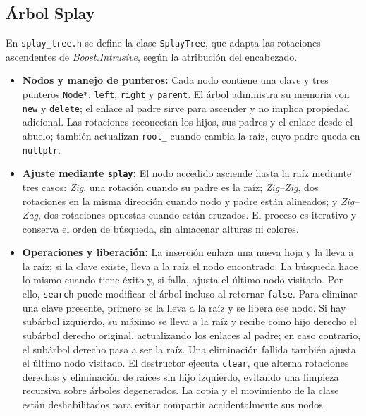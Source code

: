 \documentclass[11pt,letterpaper]{article}
\begin{document}
\subsection{Árbol Splay}

En \texttt{splay\_tree.h} se define la clase \texttt{SplayTree}, que
adapta las rotaciones ascendentes de \textit{Boost.Intrusive}, según
la atribución del encabezado.

\begin{itemize}
    \item \textbf{Nodos y manejo de punteros:}
    Cada nodo contiene una clave y tres punteros \texttt{Node*}:
    \texttt{left}, \texttt{right} y \texttt{parent}. El árbol administra
    su memoria con \texttt{new} y \texttt{delete}; el enlace al padre
    sirve para ascender y no implica propiedad adicional. Las rotaciones
    reconectan los hijos, sus padres y el enlace desde el abuelo; también
    actualizan \texttt{root\_} cuando cambia la raíz, cuyo padre queda
    en \texttt{nullptr}.

    \item \textbf{Ajuste mediante \texttt{splay}:}
    El nodo accedido asciende hasta la raíz mediante tres casos:
    \textit{Zig}, una rotación cuando su padre es la raíz;
    \textit{Zig--Zig}, dos rotaciones en la misma dirección cuando
    nodo y padre están alineados; y \textit{Zig--Zag}, dos rotaciones
    opuestas cuando están cruzados. El proceso es iterativo y conserva
    el orden de búsqueda, sin almacenar alturas ni colores.

    \item \textbf{Operaciones y liberación:}
    La inserción enlaza una nueva hoja y la lleva a la raíz; si la clave
    existe, lleva a la raíz el nodo encontrado. La búsqueda hace lo
    mismo cuando tiene éxito y, si falla, ajusta el último nodo visitado.
    Por ello, \texttt{search} puede modificar el árbol incluso al
    retornar \texttt{false}. Para eliminar una clave presente, primero
    se la lleva a la raíz y se libera ese nodo. Si hay subárbol izquierdo,
    su máximo se lleva a la raíz y recibe como hijo derecho el subárbol
    derecho original, actualizando los enlaces al padre; en caso
    contrario, el subárbol derecho pasa a ser la raíz. Una eliminación
    fallida también ajusta el último nodo visitado. El destructor ejecuta
    \texttt{clear}, que alterna rotaciones derechas y eliminación de
    raíces sin hijo izquierdo, evitando una limpieza recursiva sobre
    árboles degenerados. La copia y el movimiento de la clase están
    deshabilitados para evitar compartir accidentalmente sus nodos.
\end{itemize}
\end{document}

